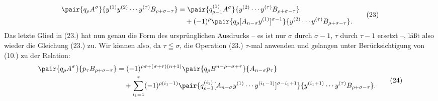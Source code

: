 \begin{equation}
\begin{aligned}
\pair{q_\rho A^\sigma}{y^{(1)}y^{(2)}\cdots y^{(\tau)}B_{\rho+\sigma-\tau}}
&=\pair{q_{\rho-1}^{(1)}A^\sigma}{y^{(2)}\cdots y^{(\tau)}B_{\rho+\sigma-\tau}}\\
&\quad+(-1)^\rho\pair{q_\rho[A_{n-\sigma}y^{(1)}]^{\sigma-1}}{y^{(2)}\cdots y^{(\tau)}B_{\rho+\sigma-\tau}}.
\end{aligned}
\tag{23}
\end{equation}
Das letzte Glied in (23.) hat nun genau die Form des urspr\"unglichen Ausdrucks -- es ist nur $\sigma$ durch $\sigma-1$, $\tau$ durch $\tau-1$ ersetzt --, l\"a\ss t also wieder die Gleichung (23.) zu. Wir k\"onnen also, da $\tau\leqq\sigma$, die Operation (23.) $\tau$-mal anwenden und gelangen unter Ber\"ucksichtigung von (10.) zu der Relation:
\begin{equation}
\begin{aligned}
\pair{q_\rho A^\sigma}{p_\tau B_{\rho+\sigma-\tau}}
&=(-1)^{\rho\sigma+(\sigma+\tau)(n+1)}
  \pair{q_\rho B^{n-\rho-\sigma+\tau}}{A_{n-\sigma}p_\tau}\\
&\quad+\sum_{i_1=1}^{\tau}(-1)^{\rho(i_1-1)}
 \pair{q_{\rho-1}^{(i_1)}[A_{n-\sigma}y^{(1)}\cdots y^{(i_1-1)}]^{\sigma-i_1+1}}
 {y^{(i_1+1)}\cdots y^{(\tau)}B_{\rho+\sigma-\tau}}.
\end{aligned}
\tag{24}
\end{equation}
